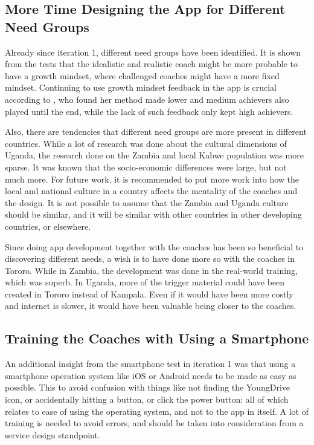 \subsection{More Time Designing the App for Different Need Groups}
Already since iteration 1, different need groups have been identified. It is shown from the tests that the idealistic and realistic coach might be more probable to have a growth mindset, where challenged coaches might have a more fixed mindset. Continuing to use growth mindset feedback in the app is crucial according to \cite{dweck}, who found her method made lower and medium achievers also played until the end, while the lack of such feedback only kept high achievers.

Also, there are tendencies that different need groups are more present in different countries. While a lot of research was done about the cultural dimensions of Uganda, the research done on the Zambia and local Kabwe population was more sparse. It was known that the socio-economic differences were large, but not much more. For future work, it is recommended to put more work into how the local and national culture in a country affects the mentality of the coaches and the design. It is not possible to assume that the Zambia and Uganda culture should be similar, and it will be similar with other countries in other developing countries, or elsewhere.

Since doing app development together with the coaches has been so beneficial to discovering different needs, a wish is to have done more so with the coaches in Tororo. While in Zambia, the development was done in the real-world training, which was superb. In Uganda, more of the trigger material could have been created in Tororo instead of Kampala. Even if it would have been more costly and internet is slower, it would have been valuable being closer to the coaches.

\subsection{Training the Coaches with Using a Smartphone}
An additional insight from the smartphone test in iteration 1 was that using a smartphone operation system like iOS or Android needs to be made as easy as possible. This to avoid confusion with things like not finding the YoungDrive icon, or accidentally hitting a button, or click the power button: all of which relates to ease of using the operating system, and not to the app in itself. A lot of training is needed to avoid errors,  and should be taken into consideration from a service design standpoint.

